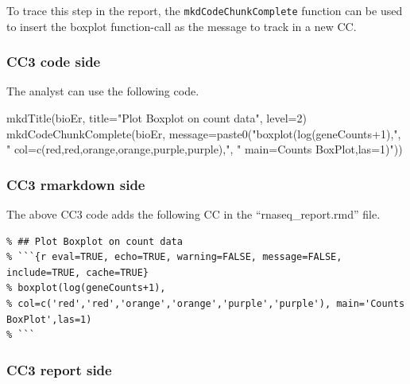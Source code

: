 \documentclass[
]{article}
\newenvironment{Shaded}{\begin{snugshade}}{\end{snugshade}}
\newcommand{\AttributeTok}[1]{\textcolor[rgb]{0.77,0.63,0.00}{#1}}
\newcommand{\DecValTok}[1]{\textcolor[rgb]{0.00,0.00,0.81}{#1}}
\newcommand{\FunctionTok}[1]{\textcolor[rgb]{0.00,0.00,0.00}{#1}}
\newcommand{\NormalTok}[1]{#1}
\newcommand{\StringTok}[1]{\textcolor[rgb]{0.31,0.60,0.02}{#1}}
\begin{document}
To trace this step in the report, the \texttt{mkdCodeChunkComplete}
function can be used to insert the boxplot function-call as the message
to track in a new CC.

\hypertarget{cc3-code-side}{%
\subsubsection{CC3 code side}\label{cc3-code-side}}

The analyst can use the following code.

\begin{Shaded}
\begin{Highlighting}[]
\FunctionTok{mkdTitle}\NormalTok{(bioEr, }\AttributeTok{title=}\StringTok{"Plot Boxplot on count data"}\NormalTok{, }\AttributeTok{level=}\DecValTok{2}\NormalTok{)}
\FunctionTok{mkdCodeChunkComplete}\NormalTok{(bioEr, }\AttributeTok{message=}\FunctionTok{paste0}\NormalTok{(}\StringTok{"boxplot(log(geneCounts+1),"}\NormalTok{,}
                        \StringTok{" col=c(\textquotesingle{}red\textquotesingle{},\textquotesingle{}red\textquotesingle{},\textquotesingle{}orange\textquotesingle{},\textquotesingle{}orange\textquotesingle{},\textquotesingle{}purple\textquotesingle{},\textquotesingle{}purple\textquotesingle{}),"}\NormalTok{, }
                        \StringTok{" main=\textquotesingle{}Counts BoxPlot\textquotesingle{},las=1)"}\NormalTok{))}
\end{Highlighting}
\end{Shaded}

\hypertarget{cc3-rmarkdown-side}{%
\subsubsection{CC3 rmarkdown side}\label{cc3-rmarkdown-side}}

The above CC3 code adds the following CC in the ``rnaseq\_report.rmd''
file.

\begin{verbatim}
% ## Plot Boxplot on count data
% ```{r eval=TRUE, echo=TRUE, warning=FALSE, message=FALSE, include=TRUE, cache=TRUE}
% boxplot(log(geneCounts+1), 
% col=c('red','red','orange','orange','purple','purple'), main='Counts BoxPlot',las=1)
% ```
\end{verbatim}

\hypertarget{cc3-report-side}{%
\subsubsection{CC3 report side}\label{cc3-report-side}}
\end{document}
